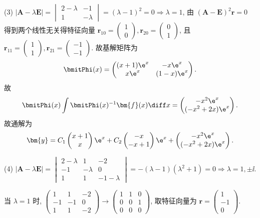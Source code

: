 \begin{solve}
  (3) $|\bm{A}-\lambda\bm{E}|=\begin{vmatrix}2-\lambda&-1\\1&-\lambda\end{vmatrix}=(\lambda-1)^2=0\Rightarrow\lambda=1$,
  由 $(\bm{A}-\bm{E})^2\bm{r}=0$ 得到两个线性无关得特征向量 
  $\bm{r}_{10}=\begin{pmatrix}1\\0\end{pmatrix},\bm{r}_{20}=\begin{pmatrix}0\\1\end{pmatrix}$, 
  且 $\bm{r}_{11}=\begin{pmatrix}1\\1\end{pmatrix},\bm{r}_{21}=\begin{pmatrix}-1\\-1\end{pmatrix}$.
  故基解矩阵为
  \[\bmitPhi(x)=\begin{pmatrix}(x+1)\e^x&-x\e^x\\x\e^x&(1-x)\e^x\end{pmatrix}.\]
  故
  \[\bmitPhi(x)\int\bmitPhi(x)^{-1}\bm{f}(x)\diff x
    = \begin{pmatrix}-x^2\e^x\\(-x^2+2x)\e^x\end{pmatrix}.\]
  故通解为
  \[\bm{y} = C_1\begin{pmatrix}x+1\\x\end{pmatrix}\e^x
    + C_2\begin{pmatrix}-x\\-x+1\end{pmatrix}\e^x
    + \begin{pmatrix}-x^2\e^x\\(-x^2+2x)\e^x\end{pmatrix}.\]

  (4) $|\bm{A}-\lambda\bm{E}|=\begin{vmatrix}2-\lambda&1&-2\\-1&-\lambda&0\\1&1&-1-\lambda\end{vmatrix}=-(\lambda-1)(\lambda^2+1)=0\Rightarrow\lambda=1,\pm\ii$.

  当 $\lambda=1$ 时, $\begin{pmatrix}1&1&-2\\-1&-1&0\\1&1&-2\end{pmatrix}\to\begin{pmatrix}1&1&0\\0&0&1\\0&0&0\end{pmatrix}$, 
  取特征向量为 $\bm{r}=\begin{pmatrix}1\\-1\\0\end{pmatrix}$.


\end{solve}
